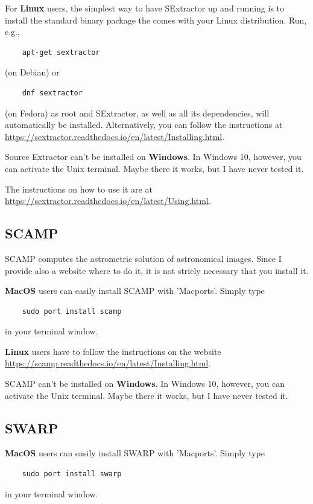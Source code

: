 \documentclass[a4paper, 11pt, fleqn]{memoir}
\begin{document}
For \textbf{Linux} users, the simplest way to have SExtractor up and running is to install the standard binary package the comes with your Linux distribution.
Run, e.g.,
\begin{verbatim}
    apt-get sextractor
\end{verbatim}
(on Debian) or
\begin{verbatim}
    dnf sextractor
\end{verbatim}
(on Fedora) as root and SExtractor, as well as all its dependencies, will automatically be installed.
Alternatively, you can follow the instructions at \url{https://sextractor.readthedocs.io/en/latest/Installing.html}.

Source Extractor can't be installed on \textbf{Windows}.
In Windows 10, however, you can activate the Unix terminal.
Maybe there it works, but I have never tested it.

The instructions on how to use it are at \url{https://sextractor.readthedocs.io/en/latest/Using.html}.

\subsection{SCAMP}

SCAMP computes the astrometric solution of astronomical images.
Since I provide also a website where to do it, it is not stricly necessary that you install it.

\textbf{MacOS} users can easily install SCAMP with 'Macports'.
Simply type
\begin{verbatim}
    sudo port install scamp
\end{verbatim}
in your terminal window.

\textbf{Linux} users have to follow the instructions on the website \url{https://scamp.readthedocs.io/en/latest/Installing.html}.

SCAMP can't be installed on \textbf{Windows}.
In Windows 10, however, you can activate the Unix terminal.
Maybe there it works, but I have never tested it.

\subsection{SWARP}

\textbf{MacOS} users can easily install SWARP with 'Macports'.
Simply type
\begin{verbatim}
    sudo port install swarp
\end{verbatim}
in your terminal window.
\end{document}
